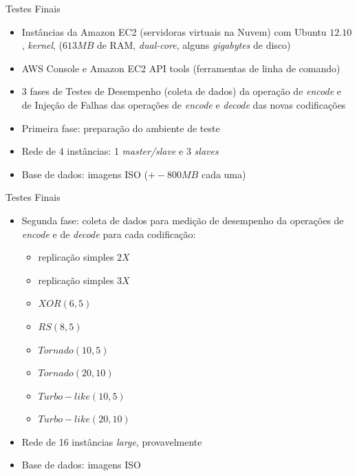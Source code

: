   \begin{frame}{Testes Finais}

     \begin{itemize}
        \item<1-> Instâncias da Amazon EC2 (servidoras virtuais na Nuvem) com Ubuntu $12.10$,  \emph{kernel},  ($613MB$ de RAM, \emph{dual-core}, alguns \emph{gigabytes} de disco)
        \item<2-> AWS Console e Amazon EC2 API tools (ferramentas de linha de comando)
        \item<3-> 3 fases de Testes de Desempenho (coleta de dados) da operação de \emph{encode} e de Injeção de Falhas das operações de \emph{encode} e \emph{decode} das novas codificações
        \item<4-> Primeira fase: preparação do ambiente de teste
        \item<5-> Rede de 4 instâncias: 1 \emph{master/slave} e 3 \emph{slaves}
        \item<6-> Base de dados: imagens ISO  ($+-800MB$ cada uma)
     \end{itemize}
  \end{frame}

  \begin{frame}{Testes Finais}
     \begin{itemize}
        \item<1-> Segunda fase: coleta de dados para medição de desempenho da operações de \emph{encode} e de \emph{decode} para cada codificação:
                  \begin{itemize}
                     \item replicação simples $2X$
                     \item replicação simples $3X$
                     \item $XOR(6,5)$
                     \item $RS(8,5)$
                     \item $Tornado(10,5)$
                     \item $Tornado(20,10)$
                     \item $Turbo-like(10,5)$
                     \item $Turbo-like(20,10)$
                 \end{itemize}
              \item<2-> Rede de 16 instâncias \emph{large}, provavelmente
        \item<2-> Base de dados: imagens ISO
     \end{itemize}
  \end{frame}


